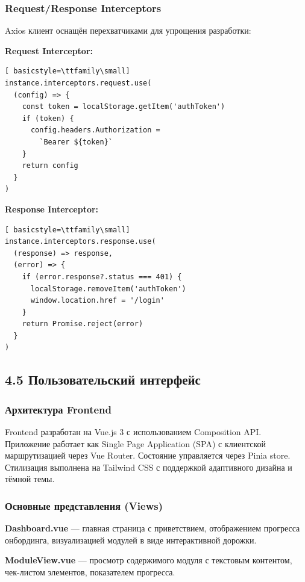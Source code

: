 \subsubsection{Request/Response Interceptors}

Axios клиент оснащён перехватчиками для упрощения разработки:

\textbf{Request Interceptor:}
\begin{lstlisting}[ basicstyle=\ttfamily\small]
instance.interceptors.request.use(
  (config) => {
    const token = localStorage.getItem('authToken')
    if (token) {
      config.headers.Authorization = 
        `Bearer ${token}`
    }
    return config
  }
)
\end{lstlisting}

\textbf{Response Interceptor:}
\begin{lstlisting}[ basicstyle=\ttfamily\small]
instance.interceptors.response.use(
  (response) => response,
  (error) => {
    if (error.response?.status === 401) {
      localStorage.removeItem('authToken')
      window.location.href = '/login'
    }
    return Promise.reject(error)
  }
)
\end{lstlisting}


\subsection{4.5 Пользовательский интерфейс}

\subsubsection{Архитектура Frontend}

Frontend разработан на Vue.js 3 с использованием Composition API. Приложение работает как Single Page Application (SPA) с клиентской маршрутизацией через Vue Router. Состояние управляется через Pinia store. Стилизация выполнена на Tailwind CSS с поддержкой адаптивного дизайна и тёмной темы.

\subsubsection{Основные представления (Views)}

\textbf{Dashboard.vue} --- главная страница с приветствием, отображением прогресса онбординга, визуализацией модулей в виде интерактивной дорожки.

\textbf{ModuleView.vue} --- просмотр содержимого модуля с текстовым контентом, чек-листом элементов, показателем прогресса.

